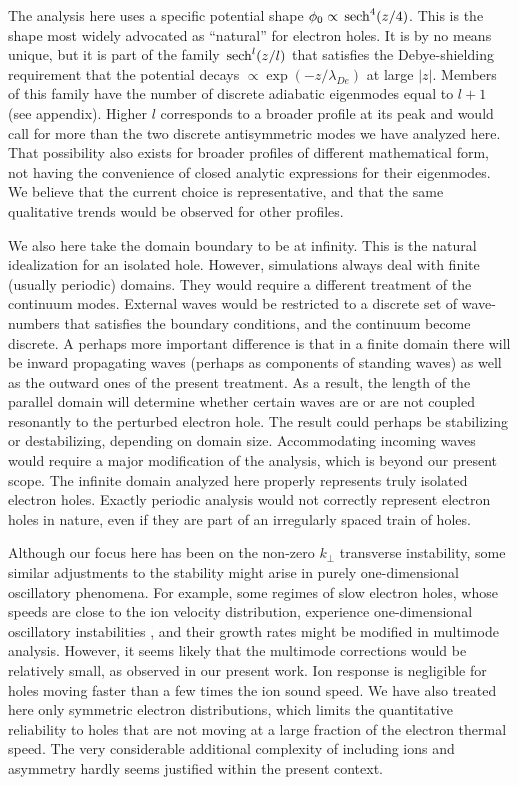 \documentclass{jpp}
\def\sech{{\,\rm sech}}
\begin{document}
The analysis here uses a specific potential shape
$\phi_0\propto \sech^4(z/4)$. This is the shape most widely advocated
as ``natural'' for electron holes. It is by no means unique, but it is
part of the family $\sech^l(z/l)$ that satisfies the Debye-shielding
requirement that the potential decays $\propto \exp(-z/\lambda_{De})$
at large $|z|$. Members of this family have the number of discrete
adiabatic eigenmodes equal to $l+1$ (see appendix). Higher $l$
corresponds to a broader profile at its peak and would call for more
than the two discrete antisymmetric modes we have analyzed here. That
possibility also exists for broader profiles of different mathematical
form, not having the convenience of closed analytic expressions for their
eigenmodes. We believe that the current choice is representative, and
that the same qualitative trends would be observed for other profiles.

We also here take the domain boundary to be at infinity. This is the
natural idealization for an isolated hole. However, simulations always
deal with finite (usually periodic) domains. They would require a
different treatment of the continuum modes. External waves would be
restricted to a discrete set of wave-numbers that satisfies the
boundary conditions, and the continuum become discrete. A perhaps more
important difference is that in a finite domain there will be inward
propagating waves (perhaps as components of standing waves) as well as
the outward ones of the present treatment. As a result, the length of
the parallel domain will determine whether certain waves are or are
not coupled resonantly to the perturbed electron hole. The result
could perhaps be stabilizing or destabilizing, depending on domain
size. Accommodating incoming waves would require a major modification of
the analysis, which is beyond our present scope. The infinite domain
analyzed here properly represents truly isolated electron
holes. Exactly periodic analysis would not correctly represent
electron holes in nature, even if they are part of an irregularly
spaced train of holes.

Although our focus here has been on the non-zero $k_\perp$ transverse
instability, some similar adjustments to the stability might arise in
purely one-dimensional oscillatory phenomena. For example, some
regimes of slow electron holes, whose speeds are close to the ion
velocity distribution, experience one-dimensional oscillatory
instabilities \citep{Zhou2017,Hutchinson2021d}, and their growth rates
might be modified in multimode analysis. However, it seems likely that
the multimode corrections would be relatively small, as observed in
our present work. Ion response is negligible for holes moving faster
than a few times the ion sound speed. We have also treated here only
symmetric electron distributions, which limits the quantitative
reliability to holes that are not moving at a large fraction of the
electron thermal speed. The very considerable additional complexity of
including ions and asymmetry hardly seems justified within the present
context. 
\end{document}
